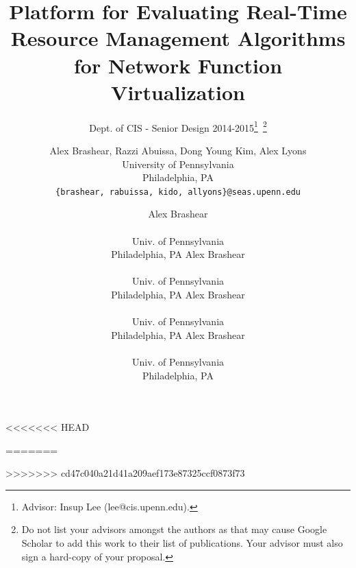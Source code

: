 \documentclass{sig-alternate}
\begin{document}
\title{Platform for Evaluating Real-Time Resource Management Algorithms for Network Function Virtualization}
\subtitle{Dept. of CIS - Senior Design 2014-2015\thanks{Advisor: Insup Lee (lee@cis.upenn.edu).}~\thanks{ Do not list your advisors amongst the authors as that may cause Google Scholar to add this work to their list of publications. Your advisor must also sign a hard-copy of your proposal.}}
<<<<<<< HEAD
\author{
\alignauthor Alex Brashear, Razzi Abuissa, Dong Young Kim, Alex Lyons\\
\vspace{.4cm}
University of Pennsylvania\\
Philadelphia, PA \\
\vspace{.4cm}
\texttt{\{brashear, rabuissa, kido, allyons\}@seas.upenn.edu}
}
=======
\author{
\alignauthor Alex Brashear \\  \\ Univ. of Pennsylvania \\ Philadelphia, PA
\alignauthor Alex Brashear \\  \\ Univ. of Pennsylvania \\ Philadelphia, PA
\alignauthor Alex Brashear \\  \\ Univ. of Pennsylvania \\ Philadelphia, PA
\alignauthor Alex Brashear \\  \\ Univ. of Pennsylvania \\ Philadelphia, PA}
>>>>>>> cd47c040a21d41a209aef173e87325ccf0873f73

\date{}
\maketitle
\end{document}
